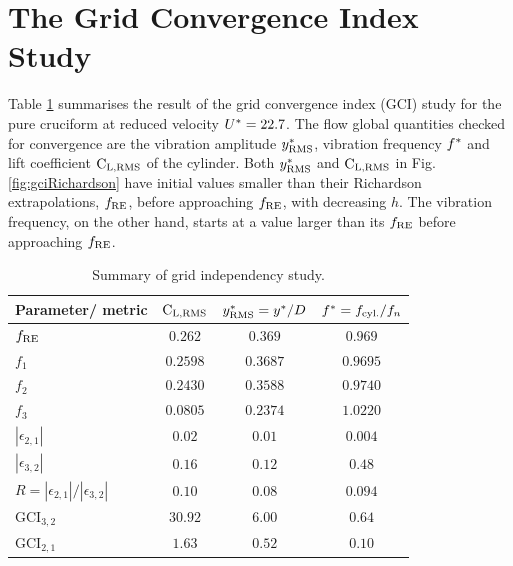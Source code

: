 \documentclass[oneside]{utmthesis}
\begin{document}
\section{The Grid Convergence Index Study} \label{sec:gciStudyResult}

Table \ref{tab:gridIndependency} summarises the result of the grid convergence index (GCI) study for the pure cruciform at reduced velocity $U^{*} = 22.7$. The flow global quantities checked for convergence are the vibration amplitude $y^{*}_{\text{RMS}}$, vibration frequency $f^{*}$ and lift coefficient $\text{C}_{\text{L,RMS}}$ of the cylinder. Both $y^{*}_{\text{RMS}}$ and $\text{C}_{\text{L,RMS}}$ in Fig. \ref{fig:gciRichardson} have initial values smaller than their Richardson extrapolations, $f_{\text{RE}}$, before approaching $f_{\text{RE}}$, with decreasing $h$. The vibration frequency, on the other hand, starts at a value larger than its $f_{\text{RE}}$ before approaching $f_{\text{RE}}$.

\begin{table}[!ht]
\centering
\caption{Summary of grid independency study.} \label{tab:gridIndependency}
\vspace{\baselineskip}
\setlength{\tabcolsep}{10pt}      %
\renewcommand{\arraystretch}{1.5} %
\begin{tabular}{l c c c}
  \hline
  \hline
Parameter/ metric                                                       & $\text{C}_{\text{L,RMS}}$       & $y^{*}_{\text{RMS}} = y^{*}/D$ & $f^{*} = f_{\text{cyl.}} / f_{n}$ \\
  \hline
$f_{\text{RE}}$                                                                  & $0.262$        & $0.369$           & $0.969$               \\
$f_{1}$                                                                 & $0.2598$       & $0.3687$          & $0.9695$              \\
$f_{2}$                                                                 & $0.2430$       & $0.3588$          & $0.9740$              \\
$f_{3}$                                                                 & $0.0805$       & $0.2374$          & $1.0220$              \\
$\left | \epsilon_{2,1} \right |$                                       & $0.02$         & $0.01$            & $0.004$               \\
$\left | \epsilon_{3,2} \right |$                                       & $0.16$         & $0.12$            & $0.48$                \\
$R = \left | \epsilon_{2,1} \right | / \left | \epsilon_{3,2} \right |$ & $0.10$         & $0.08$            & $0.094$               \\
$\text{GCI}_{3,2}$                                                      & $30.92$        & $6.00$            & $0.64$                \\
$\text{GCI}_{2,1}$                                                      & $1.63$         & $0.52$            & $0.10$                \\
  \hline
  \hline
\end{tabular}
\end{table}
\end{document}
